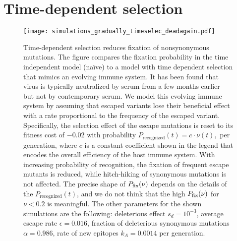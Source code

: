 \section{Time-dependent selection}
\begin{figure}[!ht]
\begin{center}
\texttt{[image: simulations\_gradually\_timeselec\_deadagain.pdf]}
\caption{
Time-dependent selection reduces fixation of nonsynonymous mutations. The figure
compares the fixation probability in the time independent model (na\"ive) to
a model with time dependent selection that mimics  an evolving immune system.
It has been found that virus is typically neutralized by serum from a few months
earlier~\cite{richman_rapid_2003} but not by contemporary serum. We model this
evolving immune system by assuming that escaped variants lose their beneficial
effect with a rate proportional to the frequency of the escaped variant. 
Specifically, the selection effect of the escape mutations is
reset to its fitness cost of $-0.02$ with probability
$ P_\text{recognized}(t) = c \cdot \nu(t), $
per generation, where $c$ is a constant coefficient shown in the legend that
encodes the overall efficiency of the host immune system. With increasing
probability of recognition, the fixation of frequent escape mutants is reduced,
while hitch-hiking of synonymous mutations is not affected. The precise
shape of $P_{\mathrm{fix}}(\nu)$ depends on the details of the $P_\text{recognized}(t)$, and 
we do not think that the high $P_{\mathrm{fix}}(\nu)$ for $\nu<0.2$ is meaningful.
The other parameters for the shown simulations are
the following: deleterious effect $s_d = 10^{-3}$, average escape rate $\epsilon = 0.016$,
fraction of deleterious synonymous mutations $\alpha = 0.986$, rate of new epitopes
$k_A=0.0014$ per generation.
}
\label{fig:tds}
\end{center}
\end{figure}

\newpage
